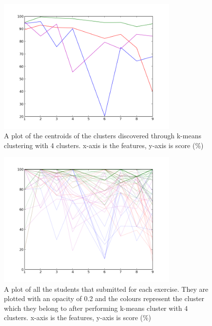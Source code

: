 \begin{figure}[h!]
\centering
\includegraphics[width=0.8\textwidth]{images/kmeans_4_centers.png}
\caption{A plot of the centroids of the clusters discovered through k-means clustering with 4 clusters. x-axis is the features, y-axis is score (\%)}
\label{fig:kmeans_4_centers}
\end{figure}

\begin{figure}[h!]
\centering
\includegraphics[width=0.8\textwidth]{images/kmeans_4.png}
\caption{A plot of all the students that submitted for each exercise. They are plotted with an opacity of 0.2 and the colours represent the cluster which they belong to after performing k-means cluster with 4 clusters. x-axis is the features, y-axis is score (\%)}
\label{fig:kmeans_4}
\end{figure}
